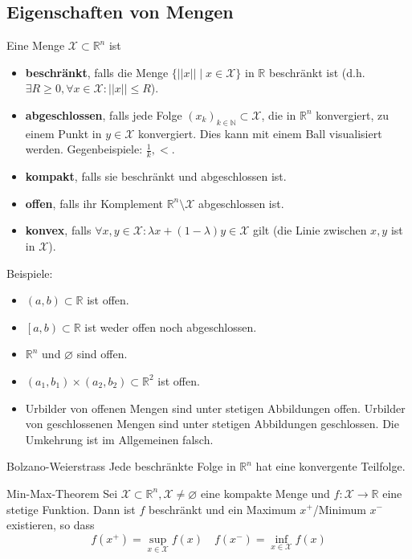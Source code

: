 \documentclass[a4paper,10pt]{article}
\def\R{\mathbb{R}}
\def\N{\mathbb{N}}
\def\X{\mathcal{X}}
\begin{document}
\subsection{Eigenschaften von Mengen}
Eine Menge \(\X \subset \R^n \) ist
\begin{itemize}
  \item \textbf{beschränkt}, falls die Menge \(\{ ||x|| \mid x \in \X \}\) in \(\R\) beschränkt ist (d.h. \(\exists R \ge 0, \forall x \in \X: ||x|| \le R\)).
  \item \textbf{abgeschlossen}, falls jede Folge \((x_k)_{k\in \N} \subset \X\), die in \(\R^n\) konvergiert, zu einem Punkt in \(y \in \X\) konvergiert. Dies kann mit einem Ball visualisiert werden. Gegenbeispiele: \(\frac{1}{k}, <\).
  \item \textbf{kompakt}, falls sie beschränkt und abgeschlossen ist.
  \item \textbf{offen}, falls ihr Komplement \(\R^n \setminus \X\) abgeschlossen ist.
  \item \textbf{konvex}, falls \(\forall x, y \in \X: \lambda x + (1 - \lambda)y \in \X\) gilt (die Linie zwischen \(x, y\) ist in \(\X\)).
\end{itemize}
Beispiele:
\begin{itemize}
  \item \((a,b) \subset \R\) ist offen.
  \item \(\left[a,b\right) \subset \R\) ist weder offen noch abgeschlossen.
  \item \(\R^n\) und \(\varnothing\) sind offen.
  \item \((a_1, b_1) \times (a_2,b_2) \subset \R^2\) ist offen.
  \item Urbilder von offenen Mengen sind unter stetigen Abbildungen offen. Urbilder von geschlossenen Mengen sind unter stetigen Abbildungen geschlossen. Die Umkehrung ist im Allgemeinen falsch.
\end{itemize}
\begin{subbox}{Bolzano-Weierstrass}
  Jede beschränkte Folge in \(\R^n\) hat eine konvergente Teilfolge.
\end{subbox}
\begin{subbox}{Min-Max-Theorem}
  Sei \(\X \subset \R^n, \X \ne \varnothing\) eine kompakte Menge und \(f: \X \to \R\) eine stetige Funktion. Dann ist \(f\) beschränkt und ein Maximum \(x^+\)/Minimum \(x^-\)existieren, so dass
  \[f(x^+) = \sup_{x\in \X} f(x) \quad f(x^-) = \inf_{x \in \X} f(x)\]
\end{subbox}
\end{document}
